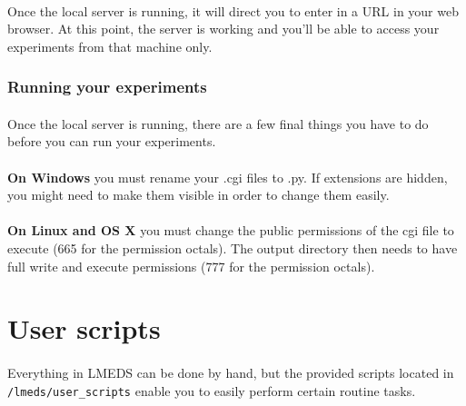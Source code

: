 \documentclass[12pt, oneside]{scrbook}   	%
\begin{document}
\paragraph{}
Once the local server is running, it will direct you to enter in a URL in your web browser.  At this point, the server is working and you'll be able to access your experiments from that machine only.

\subsubsection{Running your experiments}

\paragraph{}
Once the local server is running, there are a few final things you have to do before you can run your experiments.

\paragraph{}
\begin{tcolorbox}[breakable,colback=white,colframe=blue,width=\dimexpr\textwidth+12mm\relax,enlarge left by=-6mm,enlarge right by=6mm]
\textbf{On Windows} you must rename your .cgi files to .py.  If extensions are hidden, you might need to make them visible in order to change them easily.
\end{tcolorbox}

\paragraph{}
\begin{tcolorbox}[breakable,colback=white,colframe=green,width=\dimexpr\textwidth+12mm\relax,enlarge left by=-6mm,enlarge right by=6mm]
\textbf{On Linux and OS X} you must change the public permissions of the cgi file to execute (665 for the permission octals).  The output directory then needs to have full write and execute permissions (777 for the permission octals).
\end{tcolorbox}

\section{User scripts}
\label{users_scripts}

\paragraph{}
Everything in LMEDS can be done by hand, but the provided scripts located in \texttt{/lmeds/user\_scripts} enable you to easily perform certain routine tasks.
\end{document}
